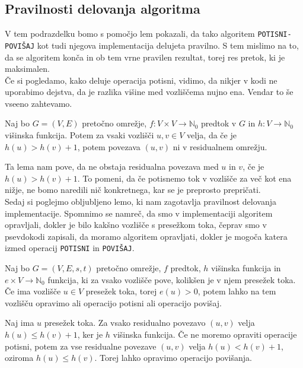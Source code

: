 \documentclass[mat1]{fmfdelo}
\newcommand{\N}{\mathbb N}
\begin{document}
\subsection{Pravilnosti delovanja algoritma}

V tem podrazdelku bomo s pomočjo lem pokazali, da tako algoritem \texttt{POTISNI-POVIŠAJ} kot tudi njegova implementacija delujeta pravilno. S tem mislimo na to, da se algoritem konča in ob tem vrne pravilen rezultat, torej res pretok, ki je maksimalen.\\

Če si pogledamo, kako deluje operacija potisni, vidimo, da nikjer v kodi ne uporabimo dejstva, da je razlika višine med vozliščema nujno ena. Vendar to še vseeno zahtevamo.

\begin{lema}
Naj bo $G = (V,E)$ pretočno omrežje, $f\colon V \times V \rightarrow \N_0$ predtok v $G$ in $h\colon V \rightarrow \N_0$ višinska funkcija. Potem za vsaki vozlišči $u,v \in V$ velja, da če je $h(u) > h(v) + 1$, potem povezava $(u,v)$ ni v residualnem omrežju.
\end{lema}

Ta lema nam pove, da ne obstaja residualna povezava med $u$ in $v$, če je $h(u) > h(v) + 1$. To pomeni, da če potisnemo tok v vozlišče za več kot ena nižje, ne bomo naredili nič konkretnega, kar se je preprosto prepričati.\\


Sedaj si poglejmo obljubljeno lemo, ki nam zagotavlja pravilnost delovanja implementacije. Spomnimo se namreč, da smo v implementaciji algoritem opravljali, dokler je bilo kakšno vozlišče s presežkom toka, čeprav smo v psevdokodi zapisali, da moramo algoritem opravljati, dokler je mogoča katera izmed operacij \texttt{POTISNI} in \texttt{POVIŠAJ}.

\begin{lema}\label{lem:potisk_ali_povisanje}
Naj bo $G=(V,E,s,t)$ pretočno omrežje, $f$ predtok, $h$ višinska funkcija in $e\times V \rightarrow \N_0$ funkcija, ki za vsako vozlišče pove, kolikšen je v njem presežek toka. Če ima vozlišče $u\in V$ presežek toka, torej $e(u) > 0$, potem lahko na tem vozlišču opravimo ali operacijo potisni ali operacijo povišaj.
\end{lema}

\begin{dokaz}
Naj ima $u$ presežek toka. Za vsako residualno povezavo $(u,v)$ velja $h(u) \leq h(v) + 1$, ker je $h$ višinska funkcija. Če ne moremo opraviti operacije potisni, potem za vse residualne povezave $(u,v)$ velja $h(u) < h(v)+1$, oziroma $h(u) \leq h(v)$. Torej lahko opravimo operacijo povišanja.
\end{dokaz}
\end{document}
